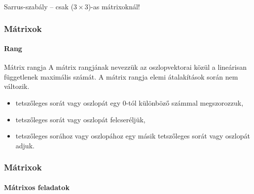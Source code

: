\documentclass[xcolor={table}]{beamer}
\begin{document}
\begin{frame}
\begin{block}{Sarrus-szabály -- csak ($3 \times 3$)-as mátrixoknál!}
  \end{block}
\end{frame}

\begin{frame}
  \frametitle{Mátrixok}
  \framesubtitle{Rang}

  \begin{block}{Mátrix rangja}
    A mátrix rangjának nevezzük az oszlopvektorai közül a lineárisan függetlenek
    maximális számát. A mátrix rangja elemi átalakítások során nem változik.
    \begin{itemize}
      \item tetszőleges sorát vagy oszlopát egy 0-tól különböző számmal
            megszorozzuk,
      \item tetszőleges sorát vagy oszlopát felcseréljük,
      \item tetszőleges sorához vagy oszlopához egy másik tetszőleges sorát
            vagy oszlopát adjuk.
    \end{itemize}
  \end{block}
\end{frame}

\begin{frame}
  \frametitle{Mátrixok}
  \framesubtitle{Mátrixos feladatok}

  \vfill
  
  \vfill
  
  \vfill
\end{frame}
\end{document}
